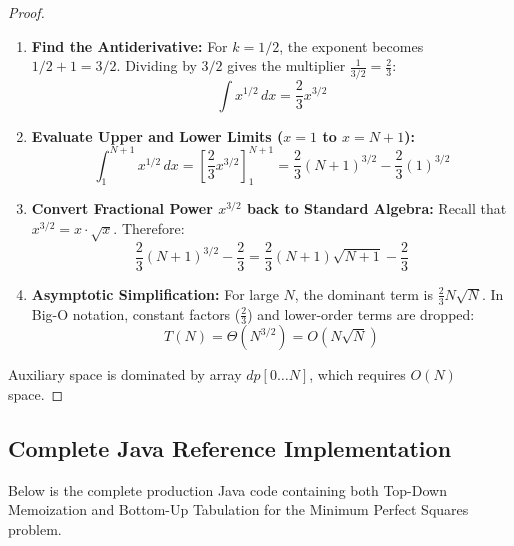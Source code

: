 \documentclass[10pt,journal,compsoc,onecolumn]{IEEEtran}
\begin{document}
\begin{proof}
\begin{enumerate}
    \item \textbf{Find the Antiderivative:} For $k = 1/2$, the exponent becomes $1/2 + 1 = 3/2$. Dividing by $3/2$ gives the multiplier $\frac{1}{3/2} = \frac{2}{3}$:
    \[
    \int x^{1/2} \, dx = \frac{2}{3} x^{3/2}
    \]
    \item \textbf{Evaluate Upper and Lower Limits ($x=1$ to $x=N+1$):}
    \[
    \int_{1}^{N+1} x^{1/2} \, dx = \left[ \frac{2}{3} x^{3/2} \right]_{1}^{N+1} = \frac{2}{3} (N+1)^{3/2} - \frac{2}{3} (1)^{3/2}
    \]
    \item \textbf{Convert Fractional Power $x^{3/2}$ back to Standard Algebra:} Recall that $x^{3/2} = x \cdot \sqrt{x}$. Therefore:
    \[
    \frac{2}{3} (N+1)^{3/2} - \frac{2}{3} = \frac{2}{3} (N+1)\sqrt{N+1} - \frac{2}{3}
    \]
    \item \textbf{Asymptotic Simplification:} For large $N$, the dominant term is $\frac{2}{3} N \sqrt{N}$. In Big-O notation, constant factors ($\frac{2}{3}$) and lower-order terms are dropped:
    \[
    T(N) = \Theta(N^{3/2}) = O(N \sqrt{N})
    \]
\end{enumerate}

Auxiliary space is dominated by array $dp[0 \dots N]$, which requires $O(N)$ space.
\end{proof}

\subsection{Complete Java Reference Implementation}

Below is the complete production Java code containing both Top-Down Memoization and Bottom-Up Tabulation for the Minimum Perfect Squares problem.
\end{document}
